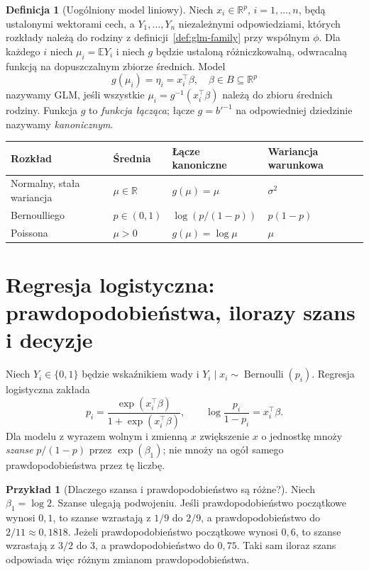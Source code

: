 \documentclass[11pt,a4paper,oneside]{report}
\numberwithin{equation}{chapter}
\theoremstyle{plain}
\theoremstyle{definition}
\newtheorem{definicja}{Definicja}[chapter]
\newtheorem{przyklad}{Przykład}[chapter]
\theoremstyle{remark}
\newcommand{\R}{\mathbb R}
\newcommand{\E}{\mathbb E}
\begin{document}
\begin{definicja}[Uogólniony model liniowy]
\label{def:glm}
Niech $x_i\in\R^p$, $i=1,\ldots,n$, będą ustalonymi
wektorami cech, a $Y_1,\ldots,Y_n$ niezależnymi
odpowiedziami, których rozkłady należą do rodziny
z definicji~\ref{def:glm-family} przy wspólnym $\phi$.
Dla każdego $i$ niech $\mu_i=\E Y_i$ i niech
$g$ będzie ustaloną różniczkowalną, odwracalną funkcją
na dopuszczalnym zbiorze średnich. Model
\[
 g(\mu_i)=\eta_i=x_i^\top\beta,
 \quad \beta\in B\subseteq\R^p
\]
nazywamy GLM, jeśli wszystkie $\mu_i=g^{-1}(x_i^\top\beta)$
należą do zbioru średnich rodziny. Funkcja $g$
to \emph{funkcja łącząca}; łącze
$g=b'^{-1}$ na odpowiedniej dziedzinie
nazywamy \emph{kanonicznym}.
\end{definicja}

\begin{center}\small
\begin{tabular}{>{\raggedright\arraybackslash}p{}>{\raggedright\arraybackslash}p{}>{\raggedright\arraybackslash}p{}>{\raggedright\arraybackslash}p{}}
\toprule
\textbf{Rozkład} & \textbf{Średnia} & \textbf{Łącze kanoniczne} & \textbf{Wariancja warunkowa}\\
\midrule
Normalny, stała wariancja & $\mu\in\R$ & $g(\mu)=\mu$ & $\sigma^2$\\
Bernoulliego & $p\in(0,1)$ & $\log(p/(1-p))$ & $p(1-p)$\\
Poissona & $\mu>0$ & $g(\mu)=\log\mu$ & $\mu$\\
\bottomrule
\end{tabular}
\end{center}

\section{Regresja logistyczna: prawdopodobieństwa, ilorazy szans i decyzje}
Niech $Y_i\in\{0,1\}$ będzie wskaźnikiem wady i
$Y_i\mid x_i\sim\operatorname{Bernoulli}(p_i)$.
Regresja logistyczna zakłada
\[
 p_i=\frac{\exp(x_i^\top\beta)}
          {1+\exp(x_i^\top\beta)},\qquad
 \log\frac{p_i}{1-p_i}=x_i^\top\beta.
\]
Dla modelu z wyrazem wolnym i zmienną $x$ zwiększenie
$x$ o jednostkę mnoży \emph{szanse} $p/(1-p)$ przez
$\exp(\beta_1)$; nie mnoży na ogół samego
prawdopodobieństwa przez tę liczbę.

\begin{przyklad}[Dlaczego szansa i prawdopodobieństwo są różne?]
Niech $\beta_1=\log2$. Szanse ulegają podwojeniu.
Jeśli prawdopodobieństwo początkowe wynosi $0{,}1$,
to szanse wzrastają z $1/9$ do $2/9$,
a prawdopodobieństwo do $2/11\approx0{,}1818$.
Jeżeli prawdopodobieństwo początkowe wynosi $0{,}6$,
to szanse wzrastają z $3/2$ do $3$,
a prawdopodobieństwo do $0{,}75$.
Taki sam iloraz szans odpowiada więc różnym zmianom
prawdopodobieństwa.
\end{przyklad}
\end{document}
